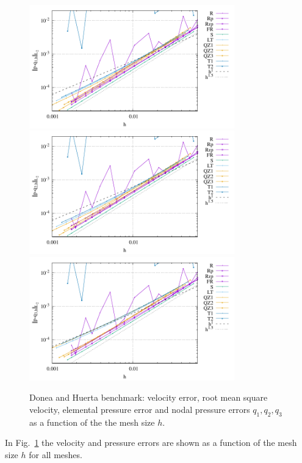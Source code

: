\documentclass[a4paper,12pt]{article}
\begin{document}
\begin{figure}
\includegraphics[width=8.9cm]{../results/errors_q1_exp1}\\
\includegraphics[width=8.9cm]{../results/errors_q2_exp1}
\includegraphics[width=8.9cm]{../results/errors_q3_exp1}
\caption{Donea and Huerta benchmark: velocity error, 
root mean square velocity, elemental pressure error and nodal pressure errors $q_1,q_2,q_3$
as a function of the the mesh size $h$.} 
\label{fig:resdh}
\end{figure}

In Fig.~\ref{fig:resdh} the velocity and pressure errors are shown as a function of the 
mesh size $h$ for all meshes.
\end{document}
